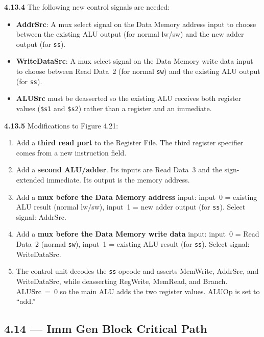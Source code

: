 \medskip\noindent\textbf{4.13.4}
The following new control signals are needed:
\begin{itemize}
  \item \textbf{AddrSrc}: A mux select signal on the Data Memory address input
        to choose between the existing ALU output (for normal lw/sw) and the
        new adder output (for \texttt{ss}).
  \item \textbf{WriteDataSrc}: A mux select signal on the Data Memory write
        data input to choose between Read Data~2 (for normal \texttt{sw}) and
        the existing ALU output (for \texttt{ss}).
  \item \textbf{ALUSrc} must be deasserted so the existing ALU receives both
        register values (\texttt{\$s1} and \texttt{\$s2}) rather than a
        register and an immediate.
\end{itemize}

\medskip\noindent\textbf{4.13.5}
Modifications to Figure 4.21:
\begin{enumerate}
  \item Add a \textbf{third read port} to the Register File. The third
        register specifier comes from a new instruction field.
  \item Add a \textbf{second ALU/adder}. Its inputs are Read Data~3 and the
        sign-extended immediate. Its output is the memory address.
  \item Add a \textbf{mux before the Data Memory address} input:
        input~0 = existing ALU result (normal lw/sw), input~1 = new
        adder output (for \texttt{ss}). Select signal: AddrSrc.
  \item Add a \textbf{mux before the Data Memory write data} input:
        input~0 = Read Data~2 (normal \texttt{sw}),
        input~1 = existing ALU result (for \texttt{ss}).
        Select signal: WriteDataSrc.
  \item The control unit decodes the \texttt{ss} opcode and asserts
        MemWrite, AddrSrc, and WriteDataSrc, while deasserting RegWrite,
        MemRead, and Branch. ALUSrc~=~0 so the main ALU adds the two register
        values. ALUOp is set to ``add.''
\end{enumerate}

\subsection*{4.14 --- Imm Gen Block Critical Path}
\hypertarget{sol-4.14}{}

